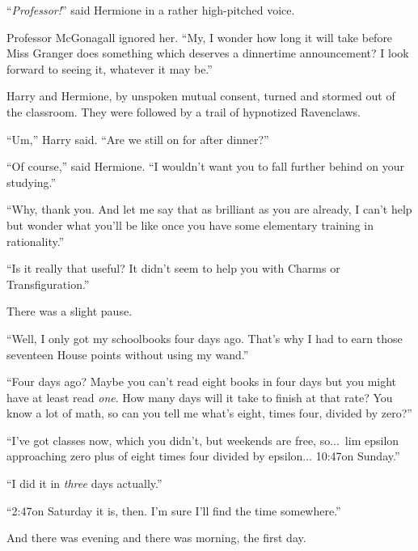 “\emph{Professor!}” said Hermione in a rather high-pitched voice.

Professor McGonagall ignored her. “My, I wonder how long it will take before Miss Granger does something which deserves a dinnertime announcement? I look forward to seeing it, whatever it may be.”

Harry and Hermione, by unspoken mutual consent, turned and stormed out of the classroom. They were followed by a trail of hypnotized Ravenclaws.

“Um,” Harry said. “Are we still on for after dinner?”

“Of course,” said Hermione. “I wouldn’t want you to fall further behind on your studying.”

“Why, thank you. And let me say that as brilliant as you are already, I can’t help but wonder what you’ll be like once you have some elementary training in rationality.”

“Is it really that useful? It didn’t seem to help you with Charms or Transfiguration.”

There was a slight pause.

“Well, I only got my schoolbooks four days ago. That’s why I had to earn those seventeen House points without using my wand.”

“Four days ago? Maybe you can’t read eight books in four days but you might have at least read \emph{one}. How many days will it take to finish at that rate? You know a lot of math, so can you tell me what’s eight, times four, divided by zero?”

“I’ve got classes now, which you didn’t, but weekends are free, so...\ lim epsilon approaching zero plus of eight times four divided by epsilon... 10:47\AM on Sunday.”

“I did it in \emph{three} days actually.”

“2:47\PM on Saturday it is, then. I’m sure I’ll find the time somewhere.”

And there was evening and there was morning, the first day.


